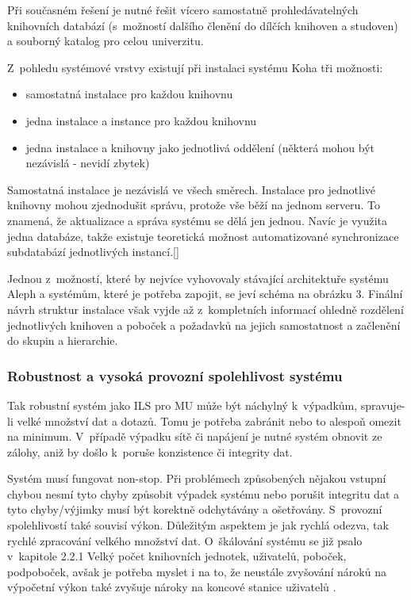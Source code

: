 \documentclass[
	11pt, oneside, printed, draft, 
	table,   %
	lof,     %
	lot     %
]{fithesis3}
\newcommand{\citepages}[2]{[\cite[#1]{#2}]}
\begin{document}
{Při současném řešení je nutné řešit vícero samostatně prohledávatelných knihovních databází (s~možností dalšího členění do dílčích knihoven a studoven) a souborný katalog pro celou univerzitu.

Z~pohledu systémové vrstvy existují při instalaci systému Koha tři možnosti:

\begin{itemize}
\item samostatná instalace pro každou knihovnu
\item jedna instalace a instance pro každou knihovnu
\item jedna instalace a knihovny jako jednotlivá oddělení (některá mohou být nezávislá - nevidí zbytek)
\end{itemize}

Samostatná instalace je nezávislá ve všech směrech.
Instalace pro jednotlivé knihovny mohou zjednodušit správu, protože vše běží na jednom serveru. To znamená, že aktualizace a správa systému se dělá jen jednou. Navíc je využita jedna databáze, takže existuje teoretická možnost automatizované synchronizace subdatabází jednotlivých instancí.\citepages{19-21}{breeding_2012}

Jednou z~možností, které by nejvíce vyhovovaly stávající architektuře systému Aleph a systémům, které je potřeba zapojit, se jeví schéma na obrázku 3. Finální návrh struktur instalace však vyjde až z~kompletních informací ohledně rozdělení jednotlivých knihoven a poboček a požadavků na jejich samostatnost a začlenění do skupin a hierarchie.


\subsubsection{Robustnost a vysoká provozní spolehlivost systému}
Tak robustní systém jako ILS pro MU může být náchylný k~výpadkům, spravuje-li velké množství dat a dotazů. Tomu je potřeba zabránit nebo to alespoň omezit na minimum. V~případě výpadku sítě či napájení je nutné systém obnovit ze zálohy, aniž by došlo k~poruše konzistence či integrity dat.

Systém musí fungovat non-stop. Při problémech způsobených nějakou vstupní chybou nesmí tyto chyby způsobit výpadek systému nebo porušit integritu dat%
 a tyto chyby/výjimky musí být korektně odchytávány a ošetřovány. S~provozní spolehlivostí také souvisí výkon. Důležitým aspektem je jak rychlá odezva, tak rychlé zpracování velkého množství dat. O~škálování systému se již psalo v~kapitole 2.2.1 Velký počet knihovních jednotek, uživatelů, poboček, podpoboček, avšak je potřeba myslet i na to, že neustále zvyšování nároků na výpočetní výkon také zvyšuje nároky na koncové stanice uživatelů%
. 

}
\end{document}
